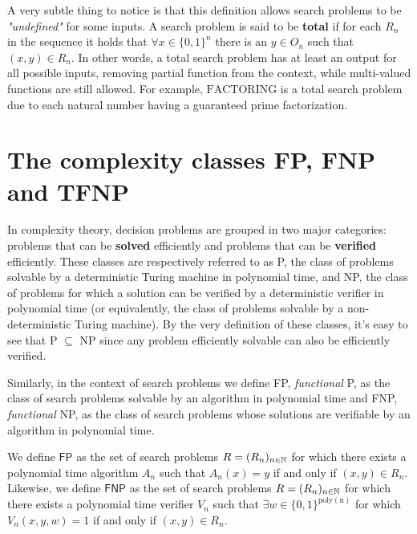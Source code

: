 A very subtle thing to notice is that this definition allows search problems to be \textit{"undefined"} for some inputs. A search problem is said to be \textbf{total} if for each $R_n$ in the sequence it holds that $\forall x \in \{0,1\}^n$ there is an $y \in O_n$ such that $(x,y) \in R_n$. In other words, a total search problem has at least an output for all possible inputs, removing partial function from the context, while multi-valued functions are still allowed. For example, $\mathrm{FACTORING}$ is a total search problem due to each natural number having a guaranteed prime factorization.

\newpage

\section{The complexity classes \textsf{FP}, \textsf{FNP} and \textsf{TFNP}}

In complexity theory, decision problems are grouped in two major categories: problems that can be \textbf{solved} efficiently and problems that can be \textbf{verified} efficiently. These classes are respectively referred to as \textsf{P}, the class of problems solvable by a deterministic Turing machine in polynomial time, and \textsf{NP}, the class of problems for which a solution can be  verified  by a deterministic verifier in polynomial time (or equivalently, the class of problems solvable by a non-deterministic Turing machine). By the very definition of these classes, it's easy to see that \textsf{P} $\subseteq$ \textsf{NP} since any problem efficiently solvable can also be efficiently verified.

Similarly, in the context of search problems we define \textsf{FP}, \textit{functional} \textsf{P}, as the class of search problems solvable by an algorithm in polynomial time and \textsf{FNP}, \textit{functional} \textsf{NP}, as the class of search problems whose solutions are verifiable by an algorithm in polynomial time. 

\begin{definition}
    We define $\mathsf{FP}$ as the set of search problems $R = (R_n)_{n \in \mathbb{N}}$ for which there exists a polynomial time algorithm $A_n$ such that $A_n(x) = y$ if and only if $(x,y) \in R_n$. Likewise, we define $\mathsf{FNP}$ as the set of search problems $R = (R_n)_{n \in \mathbb{N}}$ for which there exists a polynomial time verifier $V_n$ such that $\exists w \in \{0,1\}^{\mathrm{poly(n)}}$ for which $V_n(x,y,w) = 1$ if and only if $(x,y) \in R_n$. 
\end{definition}

